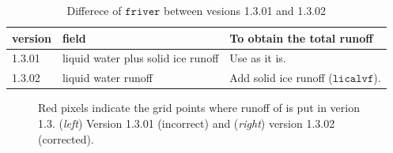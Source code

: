 \documentclass[dvipdfmx]{elsarticle_mod}
\begin{document}
\begin{table}[h]
\centering
\caption{Differece of $\mathtt{friver}$ between vesions 1.3.01 and 1.3.02 \label{tab:river_v1_3_2}}
\begin{threeparttable}
\begin{tabular*}{15cm}{p{2.0cm}|p{5.0cm}|p{8.0cm}}
\hline
version & field & To obtain the total runoff  \\ \hline \hline
1.3.01 & liquid water plus solid ice runoff &  Use as it is. \\ \hline
1.3.02 & liquid water runoff & Add solid ice runoff ($\mathtt{licalvf}$). \\ \hline
\end{tabular*}
\end{threeparttable}
\end{table}

\begin{figure}[h]
  \centering
  \caption{Red pixels indicate the grid points where runoff of \citet{Bamber_et_al_2012} is put in verion 1.3. (\textit{left}) Version 1.3.01 (incorrect) and (\textit{right}) version 1.3.02 (corrected).}
  \label{fig:bug_fix_bamber}
\end{figure}
\end{document}
